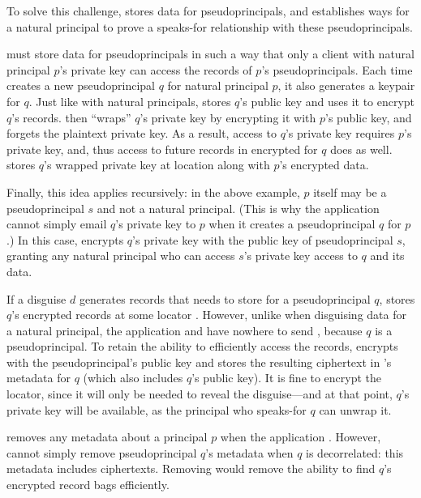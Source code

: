 %
To solve this challenge, \sys stores data for pseudoprincipals,
and establishes ways for a natural principal to prove a speaks-for
relationship with these pseudoprincipals.
%

%
\sys must store data for pseudoprincipals in such a way that only a client
with natural principal $p$'s private key can access the records of $p$'s
pseudoprincipals.
%
%
Each time \sys creates a new pseudoprincipal $q$ for natural principal $p$,
it also generates a keypair for $q$.
%
Just like with natural principals, \sys stores $q$'s public key and uses it
to encrypt $q$'s records.
%
\sys then ``wraps'' $q$'s private key by encrypting it with $p$'s public key,
and forgets the plaintext private key.
%
As a result, access to $q$'s private key requires $p$'s private key, and, thus
access to future records in \sys encrypted for $q$ does as well.
%
\sys stores $q$'s wrapped private key at location  along with
$p$'s encrypted data.
%

%
Finally, this idea applies recursively: in the above example, $p$ itself may
be a pseudoprincipal $s$ and not a natural principal.
%
(This is why the application cannot \eg simply email $q$'s private key to
$p$ when it creates a pseudoprincipal $q$ for $p$.)
%
In this case, \sys encrypts $q$'s private key with the public key of
pseudoprincipal $s$, granting any natural principal who can access
$s$'s private key access to $q$ and its data.
%

%
If a disguise $d$ generates records that \sys needs to store for a
pseudoprincipal $q$, \sys stores $q$'s encrypted records at some locator
.
%
However, unlike when disguising data for a natural principal, the
application and \sys have nowhere to send , because $q$ is a
pseudoprincipal.
%
To retain the ability to efficiently access the records, \sys encrypts
 with the pseudoprincipal's public key and stores
the resulting ciphertext in \sys's metadata for $q$ (which also includes
$q$'s public key).
%
It is fine to encrypt the locator, since it will only be needed to reveal
the disguise---and at that point, $q$'s private key will be available,
as the principal who speaks-for $q$ can unwrap it.
%

%
\sys removes any metadata about a principal $p$ when the application
.
%
However, \sys cannot simply remove pseudoprincipal $q$'s metadata when
$q$ is decorrelated: this metadata includes  ciphertexts.
%
Removing  would remove the ability to find $q$'s encrypted
record bags efficiently.
%

